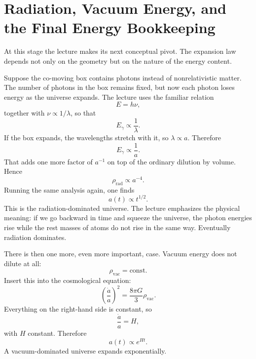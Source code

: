\section{Radiation, Vacuum Energy, and the Final Energy Bookkeeping}

At this stage the lecture makes its next conceptual pivot. The expansion law depends not only on the geometry but on the nature of the energy content.

Suppose the co-moving box contains photons instead of nonrelativistic matter. The number of photons in the box remains fixed, but now each photon loses energy as the universe expands. The lecture uses the familiar relation
\begin{equation}
E=h\nu,
\end{equation}
together with \(\nu\propto 1/\lambda\), so that
\begin{equation}
E_\gamma \propto \frac{1}{\lambda}.
\end{equation}
If the box expands, the wavelengths stretch with it, so \(\lambda\propto a\). Therefore
\begin{equation}
E_\gamma \propto \frac{1}{a}.
\end{equation}
That adds one more factor of \(a^{-1}\) on top of the ordinary dilution by volume. Hence
\begin{equation}
\rho_{\mathrm{rad}}\propto a^{-4}.
\end{equation}
Running the same analysis again, one finds
\begin{equation}
a(t)\propto t^{1/2}.
\end{equation}
This is the radiation-dominated universe. The lecture emphasizes the physical meaning: if we go backward in time and squeeze the universe, the photon energies rise while the rest masses of atoms do not rise in the same way. Eventually radiation dominates.

There is then one more, even more important, case. Vacuum energy does not dilute at all:
\begin{equation}
\rho_{\mathrm{vac}}=\text{const}.
\end{equation}
Insert this into the cosmological equation:
\begin{equation}
\left(\frac{\dot a}{a}\right)^2=\frac{8\pi G}{3}\rho_{\mathrm{vac}}.
\end{equation}
Everything on the right-hand side is constant, so
\begin{equation}
\frac{\dot a}{a}=H,
\end{equation}
with \(H\) constant. Therefore
\begin{equation}
a(t)\propto e^{Ht}.
\end{equation}
A vacuum-dominated universe expands exponentially.

